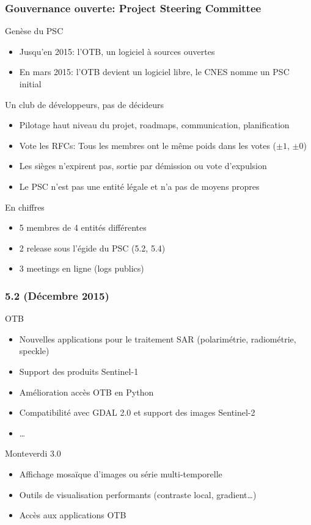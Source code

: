 \documentclass[8pt]{beamer}
\begin{document}
\begin{frame}
\frametitle{Gouvernance ouverte: Project Steering Committee}
\begin{block}{Genèse du PSC}
  \begin{itemize}
  \item Jusqu'en 2015: l'OTB, un logiciel à sources ouvertes
  \item En mars 2015: l'OTB devient un logiciel libre, le CNES nomme un PSC initial
  \end{itemize}
\end{block}
\begin{block}{Un club de développeurs, pas de décideurs}
  \begin{itemize}
  \item Pilotage haut niveau du projet, roadmaps, communication, planification
  \item Vote les RFCs: Tous les membres ont le même poids dans les votes ($\pm 1$, $\pm 0$)
  \item Les sièges n'expirent pas, sortie par démission ou vote d'expulsion
  \item Le PSC n'est pas une entité légale et n'a pas de moyens propres
  \end{itemize}
\end{block}
\begin{block}{En chiffres}
  \begin{itemize}
  \item 5 membres de 4 entités différentes
  \item 2 release sous l'égide du PSC (5.2, 5.4)
  \item 3 meetings en ligne (logs publics)
  \end{itemize}
\end{block}
\end{frame}

\begin{frame}
\frametitle{5.2 (Décembre 2015)}
\begin{block}{OTB}
\begin{itemize}
\item Nouvelles applications pour le traitement SAR (polarimétrie, radiométrie, speckle)
\item Support des produits Sentinel-1
\item Amélioration accès OTB en Python
\item Compatibilité avec GDAL 2.0 et support des images Sentinel-2
\item \ldots
\end{itemize}
\end{block}

\begin{block}{Monteverdi 3.0}
\begin{itemize}
\item Affichage mosaïque d'images ou série multi-temporelle
\item Outils de visualisation performants (contraste local, gradient\ldots)
\item Accès aux applications OTB
\end{itemize}
\end{block}
\end{frame}
\end{document}
